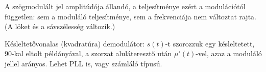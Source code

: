 \begin{center}\end{center}



\begin{center}\end{center}

\begin{center}\end{center}

A szögmodulált jel amplitúdója állandó, a teljesítménye ezért a modulációtól független: sem a moduláló teljesítménye, sem a frekvenciája nem változtat rajta. (A löket és a sávszélesség változik.)

\begin{center}\end{center}

Késleltetővonalas (kvadratúra) demodulátor: $s(t)$-t szorozzuk egy késleltetett, 90\textdegree{}-kal eltolt példányával, a szorzat aluláteresztő után $\mu'(t)$-vel, azaz a moduláló jellel arányos. Lehet PLL is, vagy számláló típusú.
\begin{eredmeny}

\begin{center}\end{center}
\end{eredmeny}


